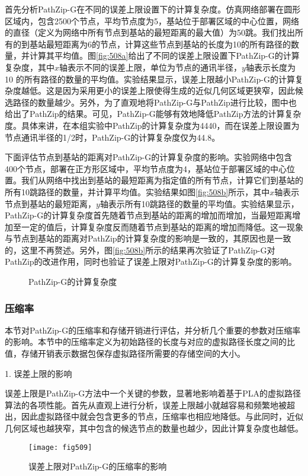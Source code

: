 首先分析PathZip-G在不同的误差上限设置下的计算复杂度。仿真网络部署在圆形区域内，包含2500个节点，平均节点度为5，基站位于部署区域的中心位置，网络的直径（定义为网络中所有节点到基站的最短距离的最大值）为50跳。我们找出所有的到基站最短距离为6的节点，计算这些节点到基站的长度为10的所有路径的数量，并计算其平均值。图\ref{fig:508a}给出了不同的误差上限设置下PathZip-G的计算复杂度，其中$x$轴表示不同的误差上限，单位为节点的通讯半径，$y$轴表示长度为10 的所有路径的数量的平均值。实验结果显示，误差上限越小PathZip-G的计算复杂度越低。这是因为采用更小的误差上限使得生成的近似几何区域更狭窄，因此候选路径的数量越少。另外，为了直观地将PathZip-G与PathZip进行比较，图中也给出了PathZip的结果。可见，PathZip-G能够有效地降低PathZip方法的计算复杂度。具体来讲，在本组实验中PathZip的计算复杂度为4440，而在误差上限设置为节点通讯半径的1/2时，PathZip-G的计算复杂度仅为44.8。

下面评估节点到基站的距离对PathZip-G的计算复杂度的影响。实验网络中包含400个节点，部署在正方形区域中，平均节点度为4，基站位于部署区域的中心位置。我们从网络中找出到基站的最短距离为指定值的所有节点，计算它们到基站的所有10跳路径的数量，并计算平均值。实验结果如图\ref{fig:508b}所示，其中$x$轴表示节点到基站的最短距离，$y$轴表示所有10跳路径的数量的平均值。实验结果显示，PathZip-G的计算复杂度首先随着节点到基站的距离的增加而增加，当最短距离增加至一定的值后，计算复杂度反而随着节点到基站的距离的增加而降低。这一现象与节点到基站的距离对PathZip的计算复杂度的影响是一致的，其原因也是一致的，这里不再赘述。另外，图\ref{fig:508b}所示的结果再次验证了PathZip-G对PathZip的改进作用，同时也验证了误差上限对PathZip-G的计算复杂度的影响。
\begin{figure}[t]
  \centering
  \hspace{0.5em}
  \caption{PathZip-G的计算复杂度}
  \label{fig:508}
\end{figure}

\subsubsection{压缩率}
本节对PathZip-G的压缩率和存储开销进行评估，并分析几个重要的参数对压缩率的影响。本节中的压缩率定义为初始路径的长度与对应的虚拟路径长度之间的比值，存储开销表示数据包保存虚拟路径所需要的存储空间的大小。

1. 误差上限的影响

误差上限是PathZip-G方法中一个关键的参数，显著地影响着基于PLA的虚拟路径算法的各项性能。首先从直观上进行分析，误差上限越小就越容易和频繁地被超出，因此虚拟路径中就会包含更多的节点，压缩率也相应地降低。与此同时，近似几何区域也越狭窄，其中包含的候选节点的数量也越少，因此计算复杂度也越低。
\begin{figure}[h]
\centering
\texttt{[image: fig509]}
\caption{误差上限对PathZip-G的压缩率的影响}
\label{fig:509}
\end{figure}

